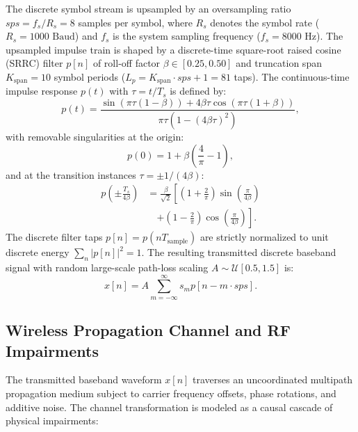 The discrete symbol stream is upsampled by an oversampling ratio $sps = f_s / R_s = 8$ samples per symbol, where $R_s$ denotes the symbol rate ($R_s = 1000\text{ Baud}$) and $f_s$ is the system sampling frequency ($f_s = 8000\text{ Hz}$). The upsampled impulse train is shaped by a discrete-time square-root raised cosine (SRRC) filter $p[n]$ of roll-off factor $\beta \in [0.25, 0.50]$ and truncation span $K_{\text{span}} = 10$ symbol periods ($L_p = K_{\text{span}} \cdot sps + 1 = 81$ taps). The continuous-time impulse response $p(t)$ with $\tau = t / T_s$ is defined by:
\begin{equation}
p(t) = \frac{\sin(\pi \tau (1 - \beta)) + 4\beta \tau \cos(\pi \tau (1 + \beta))}{\pi \tau \left(1 - (4\beta \tau)^2\right)},
\label{eq:srrc_continuous}
\end{equation}
with removable singularities at the origin:
\begin{equation}
p(0) = 1 + \beta\left(\frac{4}{\pi} - 1\right),
\end{equation}
and at the transition instances $\tau = \pm 1 / (4\beta)$:
\begin{align}
p\left(\pm \frac{T_s}{4\beta}\right) &= \frac{\beta}{\sqrt{2}} \left[ \left(1 + \frac{2}{\pi}\right) \sin\left(\frac{\pi}{4\beta}\right) \right. \nonumber \\
&\quad \left. + \left(1 - \frac{2}{\pi}\right) \cos\left(\frac{\pi}{4\beta}\right) \right].
\end{align}
The discrete filter taps $p[n] = p(n T_{\text{sample}})$ are strictly normalized to unit discrete energy $\sum_{n} |p[n]|^2 = 1$. The resulting transmitted discrete baseband signal with random large-scale path-loss scaling $A \sim \mathcal{U}[0.5, 1.5]$ is:
\begin{equation}
x[n] = A \sum_{m=-\infty}^{\infty} s_m p[n - m \cdot sps].
\label{eq:tx_baseband}
\end{equation}

\subsection{Wireless Propagation Channel and RF Impairments}
\label{subsec:channel_model}

The transmitted baseband waveform $x[n]$ traverses an uncoordinated multipath propagation medium subject to carrier frequency offsets, phase rotations, and additive noise. The channel transformation is modeled as a causal cascade of physical impairments:

